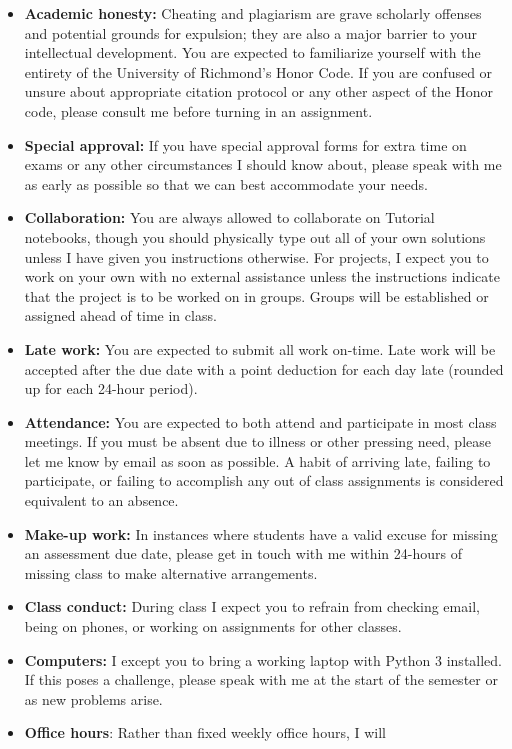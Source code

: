 \documentclass[12pt]{article}
\begin{document}
\begin{itemize}\setlength\itemsep{0em}
\item \textbf{Academic honesty:} Cheating and plagiarism are grave scholarly
offenses and potential grounds
for expulsion; they are also a major barrier to your intellectual development.
You are expected to familiarize yourself with the entirety of the
University of Richmond’s Honor Code. If you are confused or unsure about
appropriate citation protocol or any other aspect of the Honor code,
please consult me before turning in an assignment.
\item \textbf{Special approval:} If you have special approval forms for extra
time on exams or any other circumstances I should know about, please speak
with me as early as possible so that we can best accommodate your needs.
\item \textbf{Collaboration:} You are always allowed to collaborate on Tutorial
notebooks, though you should physically type out all of your own solutions
unless I have given you instructions otherwise. For projects, I expect you to
work on your own with no external assistance unless the instructions indicate
that the project is to be worked on in groups. Groups will be established or
assigned ahead of time in class.
\item \textbf{Late work:} You are expected to submit all work on-time. Late 
work will be accepted after the due date with a point deduction for each day
late (rounded up for each 24-hour period).
\item \textbf{Attendance:} You are expected to both attend and participate in most
class meetings. If you must be absent due to illness or other pressing
need, please let me know by email as soon as possible. A habit of arriving
late, failing to participate, or failing to accomplish any out of class assignments
is considered equivalent to an absence.
\item \textbf{Make-up work:} In instances where students have a valid excuse for
missing an assessment due date, please get in touch with me within 24-hours of
missing class to make alternative arrangements.
\item \textbf{Class conduct:} During class I expect you to refrain from checking
email, being on phones, or working on assignments for other classes.
\item \textbf{Computers:} I except you to bring a working laptop with Python
3 installed. If this poses a challenge, please speak with me at the 
start of the semester or as new problems arise.
\item \textbf{Office hours}: Rather than fixed weekly office hours, I will 

\end{itemize}
\end{document}

